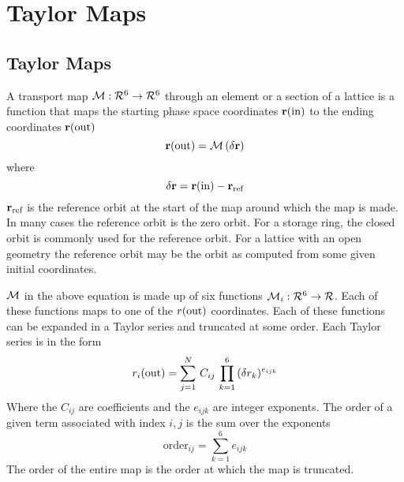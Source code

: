\chapter{Taylor Maps}

\section{Taylor Maps}
\label{s:taylor.phys}

A transport map ${\cal M}: {\cal R}^6 \rightarrow {\cal R}^6$ through an element or a section of a
lattice is a function that maps the starting phase space coordinates ${\bf r}({\text{in}})$ to the ending
coordinates ${\bf r}({\text{out}})$
\begin{equation}
  {\bf r}({\text{out}}) = {\cal M} \, (\delta {\bf r})
\end{equation}
where
\begin{equation}
  \delta {\bf r} = {\bf r}({\text{in}}) - {\bf r}_{\text{ref}}
\end{equation}
${\bf r}_{\text{ref}}$ is the reference orbit at the start of the map around which the map is made. In many
cases the reference orbit is the zero orbit. For a storage ring, the closed orbit is commonly used
for the reference orbit. For a lattice with an open geometry the reference orbit may be the orbit as
computed from some given initial coordinates.

${\cal M}$ in the above equation is made up of six functions ${\cal M}_i: {\cal R}^6 \rightarrow
{\cal R}$. Each of these functions maps to one of the $r({\text{out}})$ coordinates. Each of these functions
can be expanded in a Taylor series and truncated at some order. Each Taylor series is in the form
\begin{equation}
  r_i({\text{out}}) = \sum_{j = 1}^N \, C_{ij} \, \prod_{k = 1}^6 \, (\delta r_k)^{e_{ijk}}
  \label{rcr}
\end{equation}
Where the $C_{ij}$ are coefficients and the $e_{ijk}$ are integer exponents.  The order of a given
term associated with index $i,j$ is the sum over the exponents
\begin{equation}
  \text{order}_{ij} = \sum_{k = 1}^6 e_{ijk} 
\end{equation}
The order of the entire map is the order at which the map is truncated.

